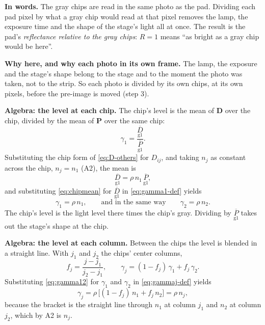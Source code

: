 \documentclass[11pt,letter]{article}
\newcommand{\iD}{\mathbf{D}}   %
\newcommand{\iP}{\mathbf{P}}   %
\newcommand{\reg}[2]{\underset{\text{#1}}{#2}}
\newcommand{\avg}[2]{\overline{\reg{#1}{#2}}}
\begin{document}
\textbf{In words.}  The gray chips are read in the same photo as the pad.
Dividing each pad pixel by what a gray chip would read at that pixel
removes the lamp, the exposure time and the shape of the stage's light all
at once.  The result is the pad's \emph{reflectance relative to the gray
chips}: $R = 1$ means ``as bright as a gray chip would be here''.

\textbf{Why here, and why each photo in its own frame.}  The lamp, the
exposure and the stage's shape belong to the stage and to the moment the
photo was taken, not to the strip.  So each photo is divided by its own
chips, at its own pixels, before the pre-image is moved (step 3).

\textbf{Algebra: the level at each chip.}  The chip's level is the mean
of $\iD$ over the chip, divided by the mean of $\iP$ over the same chip:
\begin{equation}
  \gamma_1 = \frac{\avg{g1}{D}}{\avg{g1}{P}} .
  \label{eq:gamma1-def}
\end{equation}
Substituting the chip form of \eqref{eq:D-others} for $D_{ij}$, and taking
$n_j$ as constant across the chip, $n_j = n_1$ (A2), the mean is
\begin{equation}
  \avg{g1}{D} = \rho\, n_1\, \avg{g1}{P} ,
  \label{eq:chipmean}
\end{equation}
and substituting \eqref{eq:chipmean} for $\avg{g1}{D}$ in
\eqref{eq:gamma1-def} yields
\begin{equation}
  \gamma_1 = \rho\, n_1, \qquad \text{and in the same way} \qquad
  \gamma_2 = \rho\, n_2 .
  \label{eq:gamma12}
\end{equation}
The chip's level is the light level there times the chip's gray.  Dividing
by $\avg{g1}{P}$ takes out the stage's shape at the chip.

\textbf{Algebra: the level at each column.}  Between the chips the level
is blended in a straight line.  With $j_1$ and $j_2$ the chips' center
columns,
\begin{equation}
  f_j = \frac{j - j_1}{j_2 - j_1}, \qquad
  \gamma_j = (1 - f_j)\,\gamma_1 + f_j\,\gamma_2 .
  \label{eq:gammaj-def}
\end{equation}
Substituting \eqref{eq:gamma12} for $\gamma_1$ and $\gamma_2$ in
\eqref{eq:gammaj-def} yields
\begin{equation}
  \gamma_j = \rho\,\bigl[(1 - f_j)\, n_1 + f_j\, n_2\bigr] = \rho\, n_j ,
  \label{eq:gammaj}
\end{equation}
because the bracket is the straight line through $n_1$ at column $j_1$ and
$n_2$ at column $j_2$, which by A2 is $n_j$.
\end{document}
